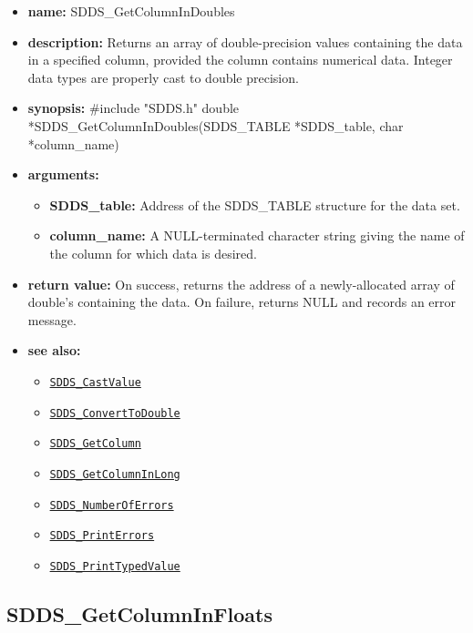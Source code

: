 \documentclass[11pt]{article}
\newcommand{\progref}[1]{\hyperref[SDDS_#1]{\tt SDDS\_#1}}
\begin{document}
\begin{itemize}
\item {\bf name:}\newline
SDDS\_GetColumnInDoubles
\item {\bf description:}\newline
Returns an array of double-precision values containing the data in a specified column, provided the column contains numerical data. Integer data types are properly cast to double precision.
\item {\bf synopsis:} \#include "SDDS.h"\newline
double *SDDS\_GetColumnInDoubles(SDDS\_TABLE *SDDS\_table, char *column\_name)
\item {\bf arguments:}
\begin{itemize}
\item {\bf SDDS\_table:} Address of the SDDS\_TABLE structure for the data set.
\item {\bf column\_name:} A NULL-terminated character string giving the name of the column for which data is desired.
\end{itemize}
\item {\bf return value:}\newline
On success, returns the address of a newly-allocated array of  double's containing the data. On failure, returns NULL and records an error message.
\item {\bf see also:}
\begin{itemize}
\item \progref{CastValue}
\item \progref{ConvertToDouble}
\item \progref{GetColumn}
\item \progref{GetColumnInLong}
\item \progref{NumberOfErrors}
\item \progref{PrintErrors}
\item \progref{PrintTypedValue}
\end{itemize}
\end{itemize}

\subsection{SDDS\_GetColumnInFloats}
\label{SDDS_GetColumnInFloats}
\end{document}
